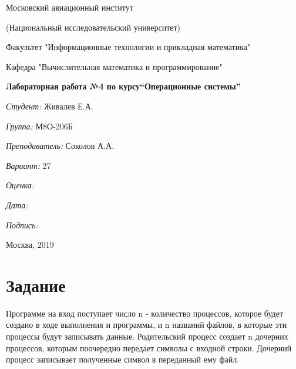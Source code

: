 \documentclass[a4paper, 12pt]{article}
\begin{document}
\thispagestyle{empty}	
\begin{center}
	Московский авиационный институт
	
	(Национальный исследовательский университет)
	
	Факультет "Информационные технологии и прикладная математика"
	
	Кафедра "Вычислительная математика и программирование"
	
\end{center}
\vspace{40ex}
\begin{center}
	\textbf{\large{Лабораторная работа №4 по курсу\linebreak \textquotedblleft Операционные системы\textquotedblright}}
\end{center}
\vspace{35ex}
\begin{flushright}
	\textit{Студент: } Живалев Е.А.
	
	\vspace{2ex}
	\textit{Группа: } М8О-206Б
	
	\vspace{2ex}
	\textit{Преподаватель: } Соколов А.А.
	
	\vspace{2ex}
	\textit{Вариант: } 27
	
	\vspace{2ex}
	\textit{Оценка: } \underline{\quad\quad\quad\quad\quad\quad}
	
	 \vspace{2ex}
	\textit{Дата: } \underline{\quad\quad\quad\quad\quad\quad}
	
	\vspace{2ex}
	\textit{Подпись: } \underline{\quad\quad\quad\quad\quad\quad}
	
\end{flushright}

\vspace{5ex}

\begin{vfill}
	\begin{center}
		Москва, 2019
	\end{center}	
\end{vfill}
\newpage

\section{Задание}

Программе на вход поступает число n - количество процессов, которое будет создано в ходе выполнения и программы, и n названий файлов, в которые эти процессы будут записывать данные. Родительский процесс создает n дочерних процессов, которым поочередно передает символы с входной строки. Дочерний процесс записывает полученные символ в переданный ему файл.
\end{document}
